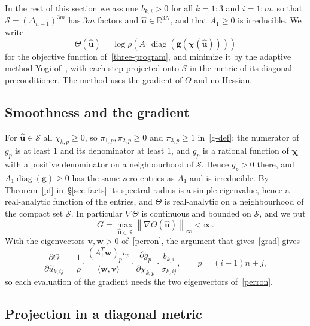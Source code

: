 \documentclass[11pt]{article}
\theoremstyle{plain}
\theoremstyle{definition}
\theoremstyle{remark}
\numberwithin{equation}{section}
\numberwithin{figure}{section}
\numberwithin{table}{section}
\begin{document}
In the rest of this section we assume $b_{k,i}>0$ for all $k=1:3$ and $i=1:m$,
so that $\mathcal{S}=\left(\Delta_{n-1}\right)^{3m}$ has $3m$ factors and
$\widehat{\bm u}\in\mathbb{R}^{3N}$, and that $A_1\ge 0$ is irreducible. We
write
\begin{equation}\label{t-F}
\Theta(\widehat{\bm u})
=\log\rho\left(A_1\operatorname{diag}\left(\bm g\left(\bm\chi(\widehat{\bm u})\right)\right)\right)
\end{equation}
for the objective function of~\eqref{three-program}, and minimize it by the
adaptive method Yogi of~\cite{2018Zaheer_Yogi}, with each step projected onto
$\mathcal{S}$ in the metric of its diagonal preconditioner. The method uses the
gradient of $\Theta$ and no Hessian.

\subsection{Smoothness and the gradient}

For $\widehat{\bm u}\in\mathcal{S}$ all $\chi_{k,p}\ge 0$, so
$\pi_{1,p},\pi_{2,p}\ge 0$ and $\pi_{3,p}\ge 1$ in~\eqref{g-def}; the
numerator of $g_p$ is at least $1$ and its denominator at least $1$, and $g_p$
is a rational function of $\bm\chi$ with a positive denominator on a
neighbourhood of $\mathcal{S}$. Hence $g_p>0$ there, and
$A_1\operatorname{diag}(\bm g)\ge 0$ has the same zero entries as $A_1$ and is
irreducible. By Theorem~\ref{pf} in~\S\ref{sec-facts} its spectral radius is a
simple eigenvalue, hence a real-analytic function of the entries, and $\Theta$
is real-analytic on a neighbourhood of the compact set $\mathcal{S}$. In
particular $\nabla\Theta$ is continuous and bounded on $\mathcal{S}$, and we
put
\begin{equation}\label{t-G}
G=\max_{\widehat{\bm u}\in\mathcal{S}}\left\|\nabla\Theta\left(\widehat{\bm u}\right)\right\|_\infty<\infty .
\end{equation}
With the eigenvectors $\bm v,\bm w>0$ of~\eqref{perron}, the argument that
gives~\eqref{grad} gives
\begin{equation}\label{t-grad}
\frac{\partial\Theta}{\partial\widehat u_{k,ij}}
=\frac{1}{\rho}\cdot\frac{\left(A_1^T\bm w\right)_pv_p}{\langle\bm w,\bm v\rangle}
\cdot\frac{\partial g_p}{\partial \chi_{k,p}}\cdot\frac{b_{k,i}}{\sigma_{k,ij}},
\qquad p=(i-1)n+j ,
\end{equation}
so each evaluation of the gradient needs the two eigenvectors of~\eqref{perron}.

\subsection{Projection in a diagonal metric}
\end{document}
